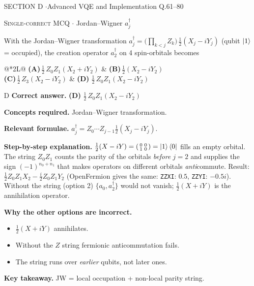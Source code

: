 \documentclass[11pt,a4paper]{article}
\newcommand{\optlabel}[1]{\textbf{(#1)}}
\newcommand{\correctlabel}[1]{\textcolor{okgreen}{\textbf{(#1)}\,\ding{51}}}
\newenvironment{qitem}[1]{\begin{list}{}{\setlength{\leftmargin}{3.3em}\setlength{\labelwidth}{3.1em}%
  \setlength{\labelsep}{0.2em}\setlength{\topsep}{3pt}\setlength{\parsep}{3pt}}\item[\textbf{Q.#1}\hfill]}{\end{list}}
\newcommand{\qsep}{\par\vspace{2pt}{\color{black!15}\hrule}\vspace{4pt}}
\newcommand{\qmeta}[2]{{\footnotesize\color{black!60}\textsc{#1} \;$\cdot$\; #2}\par}
\begin{document}
\newpage

\begin{sectionbanner}SECTION D \enspace$\cdot$\enspace Advanced VQE and Implementation \hfill Q.61--80\end{sectionbanner}

\begin{qitem}{61}
\qmeta{Single-correct MCQ}{Jordan--Wigner $a_j^\dagger$}
With the Jordan--Wigner transformation $a_j^\dagger = \big(\prod_{k<j}Z_k\big)\,\tfrac12(X_j - iY_j)$ (qubit $\ket1$ = occupied), the creation operator $a_2^\dagger$ on
4 spin-orbitals becomes
\par\smallskip\noindent\begin{tabularx}{\linewidth}{@{}*{2}{L}@{}}
\optlabel{A}\,$\tfrac12\,Z_0Z_1(X_2 + iY_2)$ & \optlabel{B}\,$\tfrac12(X_2 - iY_2)$ \\[3pt]
\optlabel{C}\,$\tfrac12\,Z_3(X_2 - iY_2)$ & \correctlabel{D}\,$\tfrac12\,Z_0Z_1(X_2 - iY_2)$
\end{tabularx}
\end{qitem}
\begin{solbox}{D}
\textbf{\color{brand}Correct answer.} \textcolor{okgreen}{\textbf{(D)}} $\tfrac12\,Z_0Z_1(X_2 - iY_2)$

\textbf{\color{brand}Concepts required.} Jordan--Wigner transformation.

\textbf{\color{brand}Relevant formulae.} $a_j^\dagger = Z_0\cdots Z_{j-1}\tfrac12(X_j - iY_j)$.

\textbf{\color{brand}Step-by-step explanation.} $\tfrac12(X - iY) = \begin{psmallmatrix}0&0\\1&0\end{psmallmatrix} = \ket1\bra0$ fills an empty orbital. The string $Z_0Z_1$ counts the parity of the orbitals \emph{before}
$j = 2$ and supplies the sign $(-1)^{n_0 + n_1}$ that makes operators on different orbitals \emph{anti}commute. Result: $\tfrac12 Z_0Z_1X_2 - \tfrac i2Z_0Z_1Y_2$
(OpenFermion gives the same: \texttt{ZZXI}: $0.5$, \texttt{ZZYI}: $-0.5i$). Without the string (option 2) $\{a_0, a_2^\dagger\}$ would not vanish;
$\tfrac12(X + iY)$ is the annihilation operator.

\textbf{\color{brand}Why the other options are incorrect.}
\begin{itemize}[leftmargin=2.4em, itemsep=1pt, topsep=2pt]
\item[\textbf{(A)}] $\frac12(X + iY)$ annihilates.
\item[\textbf{(B)}] Without the $Z$ string fermionic anticommutation fails.
\item[\textbf{(C)}] The string runs over \emph{earlier} qubits, not later ones.
\end{itemize}
\textbf{\color{brand}Key takeaway.} JW = local occupation + non-local parity string.
\end{solbox}
\qsep
\end{document}
